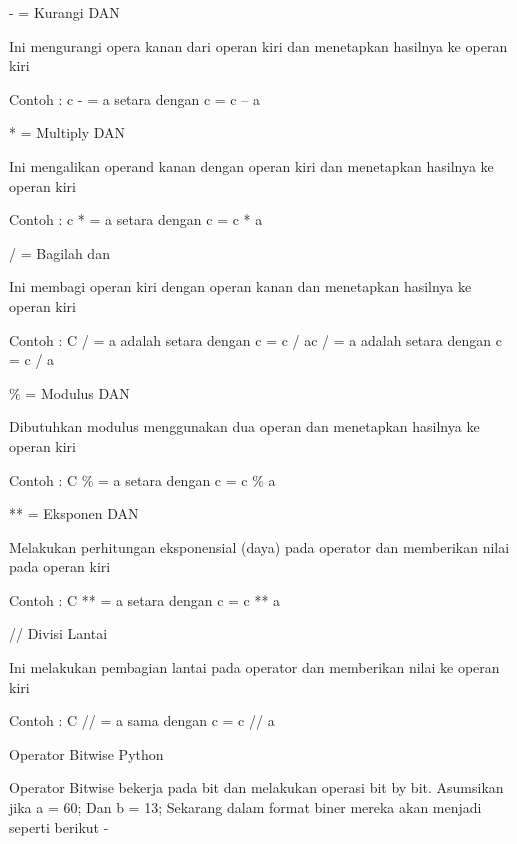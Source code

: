 \noindent 
\vspace{12pt}
\noindent 
- = Kurangi DAN \par
\noindent 
Ini mengurangi opera kanan dari operan kiri dan menetapkan hasilnya ke operan kiri \par
\noindent 
Contoh : c - = a setara dengan c = c – a \par
\noindent 
\vspace{12pt}
\noindent 
* = Multiply DAN \par
\noindent 
Ini mengalikan operand kanan dengan operan kiri dan menetapkan hasilnya ke operan kiri \par
\noindent 
Contoh : c * = a setara dengan c = c * a \par
\noindent 
\vspace{12pt}
\noindent 
/ = Bagilah dan \par
\noindent 
Ini membagi operan kiri dengan operan kanan dan menetapkan hasilnya ke operan kiri \par
\noindent 
Contoh : C / = a adalah setara dengan c = c / ac / = a adalah setara dengan c = c / a \par
\noindent 
\vspace{12pt}
\noindent 
 $  \%  $ = Modulus DAN \par
\noindent 
Dibutuhkan modulus menggunakan dua operan dan menetapkan hasilnya ke operan kiri \par
\noindent 
Contoh : C $  \%  $ = a setara dengan c = c $  \%  $ a \par
\noindent 
\vspace{12pt}
\noindent 
** = Eksponen DAN \par
\noindent 
Melakukan perhitungan eksponensial (daya) pada operator dan memberikan nilai pada operan kiri \par
\noindent 
Contoh : C ** = a setara dengan c = c ** a \par
\noindent 
\vspace{12pt}
\noindent 
// Divisi Lantai \par
\noindent 
Ini melakukan pembagian lantai pada operator dan memberikan nilai ke operan kiri \par
\noindent 
Contoh : C // = a sama dengan c = c // a \par
\noindent 
\vspace{12pt}
\noindent 
Operator Bitwise Python \par
\vspace{12pt}
\noindent 
Operator Bitwise bekerja pada bit dan melakukan operasi bit by bit. $  $Asumsikan jika a = 60; $  $Dan b = 13; $  $Sekarang dalam format biner mereka akan menjadi seperti berikut - \par
